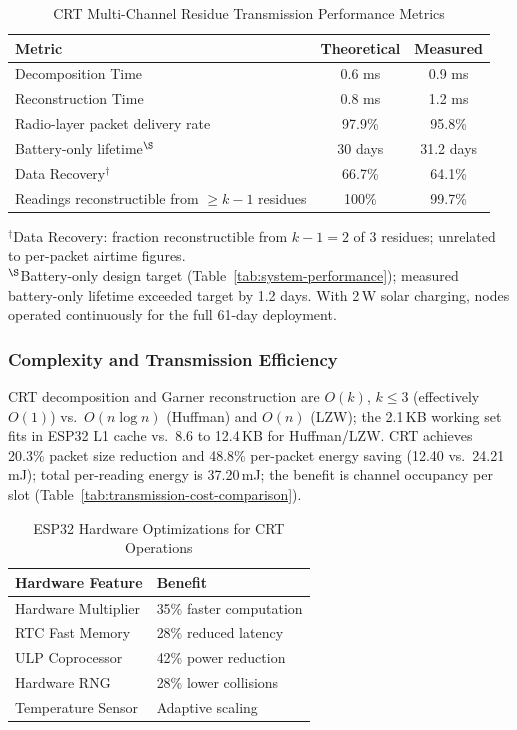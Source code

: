 \documentclass[pdflatex,sn-mathphys-num]{sn-jnl}
\theoremstyle{thmstyleone}
\theoremstyle{thmstyletwo}
\theoremstyle{thmstylethree}
\begin{document}
\begin{table}[htbp]
\caption{CRT Multi-Channel Residue Transmission Performance Metrics}
\label{tab:crt-performance}
\scriptsize
\centering
\begin{tabular}{p{}cc}
\toprule
\textbf{Metric} & \textbf{Theoretical} & \textbf{Measured} \\
\midrule
Decomposition Time & 0.6 ms & 0.9 ms \\
Reconstruction Time & 0.8 ms & 1.2 ms \\
Radio-layer packet delivery rate & 97.9\% & 95.8\% \\
Battery-only lifetime$^\S$ & 30 days & 31.2 days \\
Data Recovery$^\dagger$ & 66.7\% & 64.1\% \\
Readings reconstructible from $\geq k{-}1$ residues & 100\% & 99.7\% \\
\bottomrule
\end{tabular}
{\footnotesize $^\dagger$Data Recovery: fraction reconstructible from $k-1=2$ of 3 residues; unrelated to per-packet airtime figures.\\
$^\S$Battery-only design target (Table~\ref{tab:system-performance}); measured battery-only lifetime exceeded target by 1.2 days. With 2\,W solar charging, nodes operated continuously for the full 61-day deployment.}
\end{table}

\subsubsection{Complexity and Transmission Efficiency}
\label{subsubsec:complexity_analysis}
CRT decomposition and Garner reconstruction are $O(k)$, $k\leq3$ (effectively $O(1)$) vs.\ $O(n\log n)$ (Huffman) and $O(n)$ (LZW); the 2.1\,KB working set fits in ESP32 L1 cache vs.\ 8.6 to 12.4\,KB for Huffman/LZW. CRT achieves 20.3\% packet size reduction and 48.8\% per-packet energy saving (12.40 vs.\ 24.21\,mJ); total per-reading energy is 37.20\,mJ; the benefit is channel occupancy per slot (Table~\ref{tab:transmission-cost-comparison}).

\begin{table}[htbp]
\caption{ESP32 Hardware Optimizations for CRT Operations}
\label{tab:hardware-optimizations}
\scriptsize
\centering
\begin{tabular}{p{}p{}}
\toprule
\textbf{Hardware Feature} & \textbf{Benefit} \\
\midrule
Hardware Multiplier & 35\% faster computation \\
RTC Fast Memory & 28\% reduced latency \\
ULP Coprocessor & 42\% power reduction \\
Hardware RNG & 28\% lower collisions \\
Temperature Sensor & Adaptive scaling \\
\bottomrule
\end{tabular}
\end{table}
\end{document}
